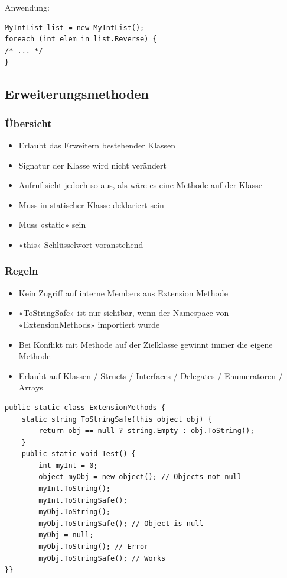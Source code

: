 Anwendung:
\begin{lstlisting}
MyIntList list = new MyIntList();
foreach (int elem in list.Reverse) {
/* ... */
}
\end{lstlisting}

\subsection{Erweiterungsmethoden}
\subsubsection{Übersicht}
\begin{itemize}
    \item Erlaubt das Erweitern bestehender Klassen
    \item Signatur der Klasse wird nicht verändert
    \item Aufruf sieht jedoch so aus, als wäre es eine Methode auf der Klasse
    \item Muss in statischer Klasse deklariert sein
    \item Muss «static» sein
    \item «this» Schlüsselwort voranstehend
\end{itemize}

\subsubsection{Regeln}
\begin{itemize}
    \item Kein Zugriff auf interne Members aus Extension Methode
    \item «ToStringSafe» ist nur sichtbar, wenn der Namespace von «ExtensionMethods» importiert wurde
    \item Bei Konflikt mit Methode auf der Zielklasse gewinnt immer die eigene Methode
    \item Erlaubt auf Klassen / Structs / Interfaces / Delegates / Enumeratoren / Arrays
\end{itemize}
\begin{lstlisting}
public static class ExtensionMethods {
    static string ToStringSafe(this object obj) {
        return obj == null ? string.Empty : obj.ToString();
    }
    public static void Test() {
        int myInt = 0;
        object myObj = new object(); // Objects not null
        myInt.ToString();
        myInt.ToStringSafe();
        myObj.ToString();
        myObj.ToStringSafe(); // Object is null
        myObj = null;
        myObj.ToString(); // Error
        myObj.ToStringSafe(); // Works
}}
\end{lstlisting}

